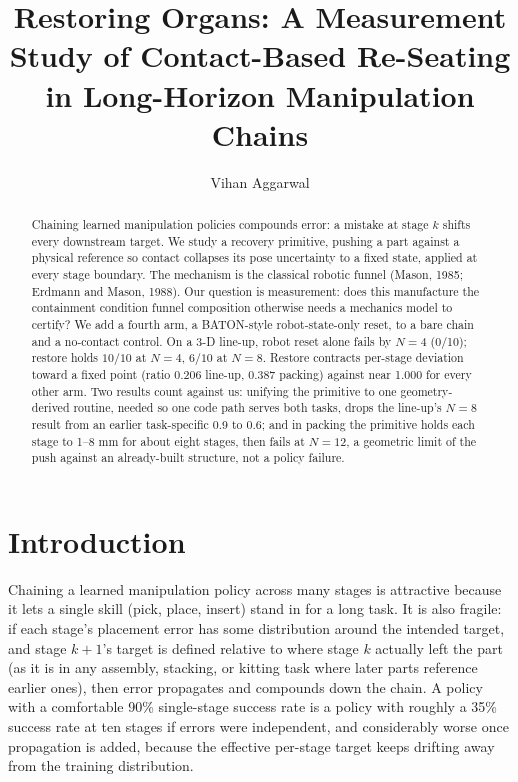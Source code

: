 \documentclass[11pt]{article}
\title{Restoring Organs: A Measurement Study of Contact-Based Re-Seating\\
in Long-Horizon Manipulation Chains}
\author{Vihan Aggarwal}
\date{}
\begin{document}
\maketitle

\begin{abstract}
Chaining learned manipulation policies compounds error: a mistake at stage
$k$ shifts every downstream target. We study a recovery primitive, pushing a
part against a physical reference so contact collapses its pose uncertainty
to a fixed state, applied at every stage boundary. The mechanism is the
classical robotic funnel (Mason, 1985; Erdmann and Mason, 1988).
Our question is measurement: does this manufacture the containment
condition funnel composition otherwise needs a mechanics model to certify?
We add a fourth arm, a BATON-style robot-state-only reset, to a bare chain
and a no-contact control. On a 3-D line-up, robot reset alone fails by
$N=4$ (0/10); restore holds $10/10$ at $N=4$, $6/10$ at $N=8$.
Restore contracts per-stage deviation toward a fixed point (ratio 0.206
line-up, 0.387 packing) against near 1.000 for every other arm. Two results
count against us: unifying the primitive to one geometry-derived routine,
needed so one code path serves both tasks, drops the line-up's $N=8$ result
from an earlier task-specific 0.9 to 0.6; and in packing the primitive holds
each stage to 1--8 mm for about eight stages, then fails at $N=12$, a
geometric limit of the push against an already-built structure, not a
policy failure.
\end{abstract}

\section{Introduction}

Chaining a learned manipulation policy across many stages is attractive
because it lets a single skill (pick, place, insert) stand in for a long
task. It is also fragile: if each stage's placement error has some
distribution around the intended target, and stage $k+1$'s target is defined
relative to where stage $k$ actually left the part (as it is in any assembly,
stacking, or kitting task where later parts reference earlier ones), then
error propagates and compounds down the chain. A policy with a comfortable
90\% single-stage success rate is a policy with roughly a 35\% success rate at
ten stages if errors were independent, and considerably worse once
propagation is added, because the effective per-stage target keeps drifting
away from the training distribution.
\end{document}
